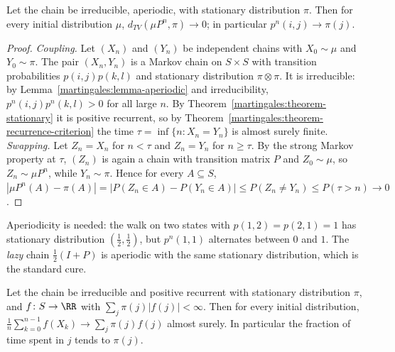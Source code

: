 \begin{theorem}\label{martingales:theorem-convergence-equilibrium}
Let the chain be irreducible, aperiodic, with stationary distribution $\pi$. Then for every initial distribution $\mu$, $d_{TV}(\mu P^n, \pi) \to 0$; in particular $p^n(i, j) \to \pi(j)$.
\end{theorem}

\begin{proof}
\emph{Coupling.} Let $(X_n)$ and $(Y_n)$ be independent chains with $X_0 \sim \mu$ and $Y_0 \sim \pi$. The pair $(X_n, Y_n)$ is a Markov chain on $S \times S$ with transition probabilities $p(i, j)p(k, l)$ and stationary distribution
$\pi \otimes \pi$. It is irreducible: by Lemma~\ref{martingales:lemma-aperiodic} and irreducibility, $p^n(i, j)p^n(k, l) > 0$ for all large $n$. By Theorem~\ref{martingales:theorem-stationary} it is positive recurrent, so by
Theorem~\ref{martingales:theorem-recurrence-criterion} the time $\tau = \inf\{n : X_n = Y_n\}$ is almost surely finite.
\emph{Swapping.} Let $Z_n = X_n$ for $n < \tau$ and $Z_n = Y_n$ for $n \geq \tau$. By the strong Markov property at $\tau$, $(Z_n)$ is again a chain with transition matrix $P$ and $Z_0 \sim \mu$, so $Z_n \sim \mu P^n$, while $Y_n \sim \pi$.
Hence for every $A \subseteq S$, $|\mu P^n(A) - \pi(A)| = |P(Z_n \in A) - P(Y_n \in A)| \leq P(Z_n \neq Y_n) \leq P(\tau > n) \to 0$.
\end{proof}

\begin{counterexample}\label{martingales:counterexample-periodic}
Aperiodicity is needed: the walk on two states with $p(1, 2) = p(2, 1) = 1$ has stationary distribution $(\frac12, \frac12)$, but $p^n(1, 1)$ alternates between $0$ and $1$. The \emph{lazy} chain $\frac12(I + P)$ is aperiodic with
the same stationary distribution, which is the standard cure.
\end{counterexample}

\begin{theorem}\label{martingales:theorem-markov-ergodic}
Let the chain be irreducible and positive recurrent with stationary distribution $\pi$, and $f \colon S \to \RR$ with $\sum_j\pi(j)|f(j)| < \infty$. Then for every initial distribution,
$\frac1n\sum_{k=0}^{n-1}f(X_k) \to \sum_j\pi(j)f(j)$ almost surely. In particular the fraction of time spent in $j$ tends to $\pi(j)$.
\end{theorem}


